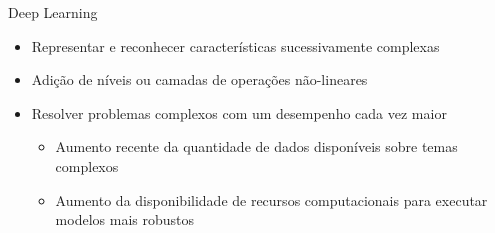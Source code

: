 %

\begin{frame}{Deep Learning}
   \ \  \\[0.1cm]
   \begin{itemize}
     \item Representar e reconhecer características sucessivamente complexas
     \item Adição de níveis ou camadas de operações não-lineares
     \item Resolver problemas complexos com um desempenho cada vez maior
     \begin{itemize}
       \item Aumento recente da quantidade de dados disponíveis sobre temas complexos
       \item Aumento da disponibilidade de recursos computacionais para executar modelos mais robustos
     \end{itemize}
   \end{itemize}
\end{frame}

